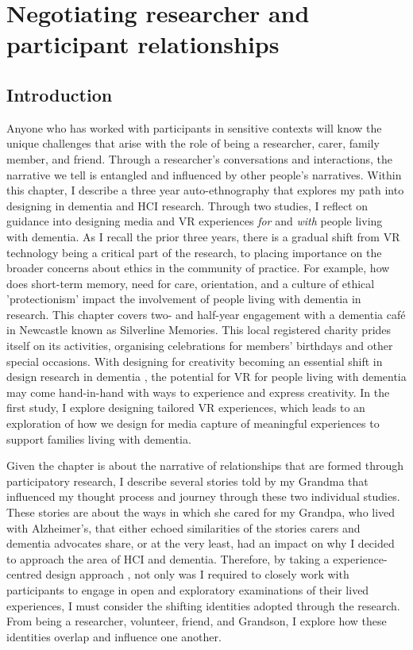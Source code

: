 \chapter{Negotiating researcher and participant relationships}
\label{NegotatingReseacherParticipantRelationships}
\section{Introduction}
\label{Relationships:Introduction}
Anyone who has worked with participants in sensitive contexts will know the unique challenges that arise with the role of being a researcher, carer, family member, and friend. Through a researcher's conversations and interactions, the narrative we tell is entangled and influenced by other people's narratives. Within this chapter, I describe a three year auto-ethnography that explores my path into designing in dementia and HCI research. Through two studies, I reflect on guidance into designing media and VR experiences \textit{for} and \textit{with} people living with dementia. As I recall the prior three years, there is a gradual shift from VR technology being a critical part of the research, to placing importance on the broader concerns about ethics in the community of practice. For example, how does short-term memory, need for care, orientation, and a culture of ethical 'protectionism' impact the involvement of people living with dementia in research.  This chapter covers two- and half-year engagement with a dementia café in Newcastle known as Silverline Memories. This local registered charity prides itself on its activities, organising celebrations for members' birthdays and other special occasions. With designing for creativity becoming an essential shift in design research in dementia \citep{john_killick_claire_craig_creativity_2012,morrissey_creative_2015,wallace_design-led_2013}, the potential for VR for people living with dementia may come hand-in-hand with ways to experience and express creativity. In the first study, I explore designing tailored VR experiences, which leads to an exploration of how we design for media capture of meaningful experiences to support families living with dementia.

Given the chapter is about the narrative of relationships that are formed through participatory research, I describe several stories told by my Grandma that influenced my thought process and journey through these two individual studies. These stories are about the ways in which she cared for my Grandpa, who lived with Alzheimer's, that either echoed similarities of the stories carers and dementia advocates share, or at the very least, had an impact on why I decided to approach the area of HCI and dementia. Therefore, by taking a experience-centred design approach \citep{mccarthy_technology_2007}, not only  was I required to closely work with participants to engage in open and exploratory examinations of their lived experiences, I must consider the shifting identities adopted through the research. From being a researcher, volunteer, friend, and Grandson, I explore how these identities overlap and influence one another. 

